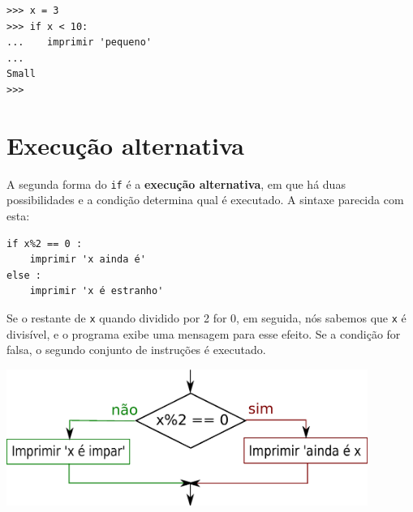 \beforeverb
\begin{verbatim}
>>> x = 3
>>> if x < 10:
...    imprimir 'pequeno'
... 
Small
>>>
\end{verbatim}
\afterverb
%

\section{Execução alternativa}
\label{execução alternativa}


A segunda forma do {\tt if} é a {\bf execução alternativa},
em que há duas possibilidades e a condição determina
qual é executado. A sintaxe parecida com esta:


\beforeverb
\begin{verbatim}
if x%2 == 0 :
    imprimir 'x ainda é'
else :
    imprimir 'x é estranho'
\end{verbatim}
\afterverb
%

Se o restante de {\tt x} quando dividido por 2 for 0, em seguida, nós
sabemos que {\tt x} é divisível, e o programa exibe uma mensagem para esse
efeito. Se a condição for falsa, o segundo conjunto de instruções é
executado.


\beforefig
\centerline{\includegraphics[height=1.75in]{figs2/if-else.eps}}
\afterfig

